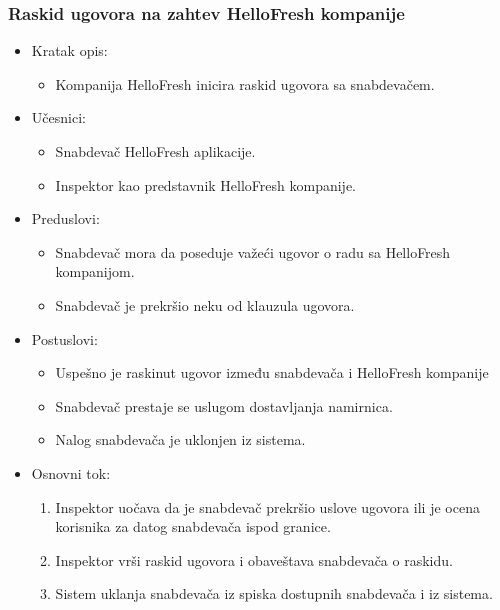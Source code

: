 \subsubsection{Raskid ugovora na zahtev HelloFresh kompanije}

\begin{itemize}
    \item Kratak opis:
        \begin{itemize}
            \item Kompanija HelloFresh inicira raskid ugovora sa snabdevačem.
        \end{itemize}
    \item Učesnici:
        \begin{itemize}
            \item Snabdevač HelloFresh aplikacije.
            \item Inspektor kao predstavnik HelloFresh kompanije.
        \end{itemize}
    \item Preduslovi:
        \begin{itemize}
            \item Snabdevač mora da poseduje važeći ugovor o radu sa HelloFresh kompanijom.
            \item Snabdevač je prekršio neku od klauzula ugovora.
        \end{itemize}
    \item Postuslovi:
        \begin{itemize}
            \item Uspešno je raskinut ugovor između snabdevača i HelloFresh kompanije
            \item Snabdevač prestaje se uslugom dostavljanja namirnica.
            \item Nalog snabdevača je uklonjen iz sistema.
        \end{itemize}
    \item Osnovni tok:
        \begin{enumerate}
            \item Inspektor uočava da je snabdevač prekršio uslove ugovora ili je ocena korisnika za datog snabdevača ispod granice.
            \item Inspektor vrši raskid ugovora i obaveštava snabdevača o raskidu.
            \item Sistem uklanja snabdevača iz spiska dostupnih snabdevača i iz sistema.
        \end{enumerate}
\end{itemize}